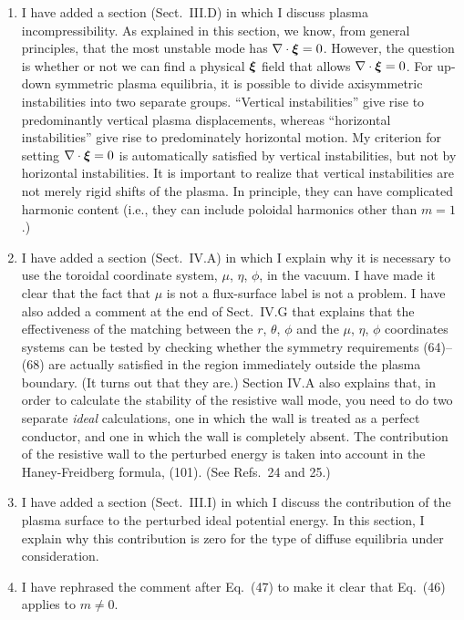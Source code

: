 \documentclass{article}[12pt]
\newcommand {\bxi}{\mbox{\boldmath$\xi$}}
\begin{document}
\begin{enumerate}
\item I have added a section (Sect.~III.D) in which I discuss plasma incompressibility. As explained in this section, we know, from general
principles, that the most unstable mode has $\nabla\cdot\bxi=0$. However, the question is whether or not we can find a physical
$\bxi$ field that allows $\nabla\cdot\bxi=0$. For up-down symmetric plasma equilibria, it is possible to divide axisymmetric instabilities into two
separate groups. ``Vertical instabilities'' give rise to predominantly vertical plasma displacements, whereas ``horizontal instabilities''
give rise to predominately horizontal motion. My criterion for setting $\nabla\cdot\bxi=0$ is automatically satisfied by vertical
instabilities, but not by horizontal instabilities. It is important to realize that vertical instabilities are not merely rigid shifts of the plasma.
In principle, they can have complicated harmonic content (i.e., they can include poloidal harmonics other than $m=1$.)

\item I have added a section (Sect.~IV.A) in which I explain why it is necessary to use the toroidal coordinate system, $\mu$, $\eta$, $\phi$,  in the vacuum.
I have made it clear that the fact that $\mu$ is not a flux-surface label is not a  problem. 
I have also added a comment at the end of Sect.~IV.G that explains that the effectiveness of the matching between the
$r$, $\theta$, $\phi$ and the $\mu$, $\eta$, $\phi$ coordinates systems can be tested by checking whether the symmetry
requirements (64)--(68) are actually satisfied in the region immediately outside the plasma boundary. (It turns out that they are.)
Section IV.A also explains that, in order to calculate the stability of the resistive wall mode, you need to do two separate {\em ideal}\/
calculations, one in which the wall is treated as a perfect conductor, and one in which the wall is completely absent. The
contribution of the resistive wall to the perturbed energy is taken into account in the Haney-Freidberg formula, (101). (See Refs.~24 and 25.)

\item I have added a section (Sect.~III.I) in which I discuss the contribution of the plasma surface to the perturbed ideal
potential energy. In this section, I explain why this contribution is zero for the type of diffuse equilibria under consideration. 

\item I have rephrased the comment after Eq.~(47) to make it clear that Eq.~(46) applies to $m\neq 0$.


\end{enumerate}
\end{document}
